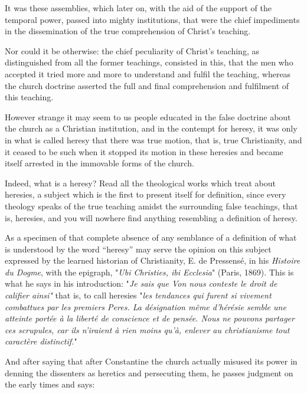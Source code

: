 \documentclass{book}
\begin{document}
It was these assemblies, which later on, with the aid of the support of the temporal power, passed into mighty institutions, that were the chief impediments in the dissemination of the true comprehension of Christ’s teaching.

Nor could it be otherwise: the chief peculiarity of Christ’s teaching, as distinguished from all the former teachings, consisted in this, that the men who accepted it tried more and more to understand and fulfil the teaching, whereas the church doctrine asserted the full and final comprehension and fulfilment of this teaching.

However strange it may seem to us people educated in the false doctrine about the church as a Christian institution, and in the contempt for heresy, it was only in what is called heresy that there was true motion, that is, true Christianity, and it ceased to be such when it stopped its motion in these heresies and became itself arrested in the immovable forms of the church.

Indeed, what is a heresy? Read all the theological works which treat about heresies, a subject which is the first to present itself for definition, since every theology speaks of the true teaching amidst the surrounding false teachings, that is, heresies, and you will nowhere find anything resembling a definition of heresy.

As a specimen of that complete absence of any semblance of a definition of what is understood by the word “heresy” may serve the opinion on this subject expressed by the learned historian of Christianity, E. de Pressensé, in his \emph{Histoire du Dogme}, with the epigraph, "\emph{Ubi Christies, ibi Ecclesia}" (Paris, 1869). This is what he says in his introduction: "\emph{Je sais que Von nous conteste le droit de califier ainsi"} that is, to call heresies "\emph{les tendances qui furent si vivement combattues par les premiers Peres. La désignation même d’hérésie semble une atteinte portée à la liberté de conscience et de pensée. Nous ne pouvons partager ces scrupules, car ils n’iraient à rien moins qu’à, enlever au christianisme tout caractère distinctif.}"

And after saying that after Constantine the church actually misused its power in denning the dissenters as heretics and persecuting them, he passes judgment on the early times and says:
\end{document}
